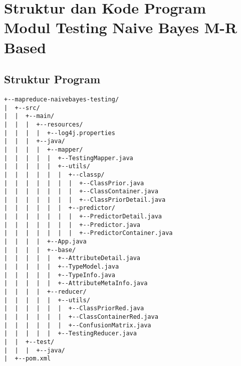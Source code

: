 \chapter{Struktur dan Kode Program Modul Testing Naive Bayes M-R Based}
\label{lamp:B}
\section{Struktur Program}
\begin{lstlisting}
+--mapreduce-naivebayes-testing/
|  +--src/
|  |  +--main/
|  |  |  +--resources/
|  |  |  |  +--log4j.properties
|  |  |  +--java/
|  |  |  |  +--mapper/
|  |  |  |  |  +--TestingMapper.java
|  |  |  |  |  +--utils/
|  |  |  |  |  |  +--classp/
|  |  |  |  |  |  |  +--ClassPrior.java
|  |  |  |  |  |  |  +--ClassContainer.java
|  |  |  |  |  |  |  +--ClassPriorDetail.java
|  |  |  |  |  |  +--predictor/
|  |  |  |  |  |  |  +--PredictorDetail.java
|  |  |  |  |  |  |  +--Predictor.java
|  |  |  |  |  |  |  +--PredictorContainer.java
|  |  |  |  +--App.java
|  |  |  |  +--base/
|  |  |  |  |  +--AttributeDetail.java
|  |  |  |  |  +--TypeModel.java
|  |  |  |  |  +--TypeInfo.java
|  |  |  |  |  +--AttributeMetaInfo.java
|  |  |  |  +--reducer/
|  |  |  |  |  +--utils/
|  |  |  |  |  |  +--ClassPriorRed.java
|  |  |  |  |  |  +--ClassContainerRed.java
|  |  |  |  |  |  +--ConfusionMatrix.java
|  |  |  |  |  +--TestingReducer.java
|  |  +--test/
|  |  |  +--java/
|  +--pom.xml
\end{lstlisting}

